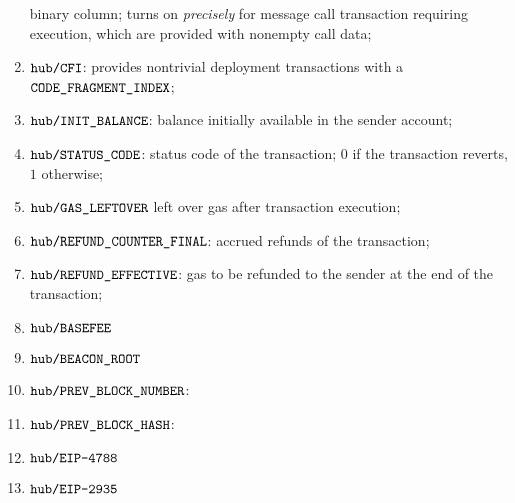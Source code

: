 \begin{enumerate}
		binary column;
		turns on \emph{precisely}
		for message call transaction
		requiring \evm{} execution,
		which are provided with nonempty call data;
	\item
		\markAsExtractedFromHub{}
		$\texttt{hub} \texttt{/}{\texttt{\texttt{CFI}}}$:
		provides nontrivial deployment transactions with a $\texttt{CODE\_FRAGMENT\_INDEX}$;
	\item
		\markAsExtractedFromHub{}
		$\texttt{hub} \texttt{/}{\texttt{\texttt{INIT\_BALANCE}}}$:
		balance initially available in the sender account;
	\item
		\markAsExtractedFromHub{}
		$\texttt{hub} \texttt{/}{\texttt{\texttt{STATUS\_CODE}}}$:
		status code of the transaction;
		$0$ if the transaction reverts,
		$1$ otherwise;
	\item
		\markAsExtractedFromHub{}
		$\texttt{hub} \texttt{/}{\texttt{\texttt{GAS\_LEFTOVER}}}$
		left over gas after transaction execution;
	\item
		\markAsExtractedFromHub{}
		$\texttt{hub} \texttt{/}{\texttt{\texttt{REFUND\_COUNTER\_FINAL}}}$:
		accrued refunds of the transaction;
	\item
		\markAsJustifiedHere{}
		$\texttt{hub} \texttt{/}{\texttt{\texttt{REFUND\_EFFECTIVE}}}$:
		gas to be refunded to the sender at the end of the transaction;
	\item
		\markAsExtractedFromBtc{}
		$\texttt{hub} \texttt{/}{\texttt{\texttt{BASEFEE}}}$
	\item
		\markAsExtractedFromBtc{}
		$\texttt{hub} \texttt{/}{\texttt{\texttt{BEACON\_ROOT}}}$
	\item
		$\texttt{hub} \texttt{/}{\texttt{\texttt{PREV\_BLOCK\_NUMBER}}}$:
	\item
		$\texttt{hub} \texttt{/}{\texttt{\texttt{PREV\_BLOCK\_HASH}}}$:
	\item
		$\texttt{hub} \texttt{/}{\texttt{\texttt{EIP-4788}}}$
	\item
		$\texttt{hub} \texttt{/}{\texttt{\texttt{EIP-2935}}}$
\end{enumerate}


